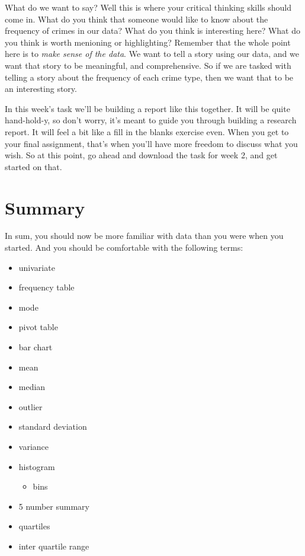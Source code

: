 \documentclass[
]{book}
\providecommand{\tightlist}{%
  \setlength{\itemsep}{0pt}\setlength{\parskip}{0pt}}
\begin{document}
What do we want to say? Well this is where your critical thinking skills should come in. What do you think that someone would like to know about the frequency of crimes in our data? What do you think is interesting here? What do you think is worth menioning or highlighting? Remember that the whole point here is to \emph{make sense of the data}. We want to tell a story using our data, and we want that story to be meaningful, and comprehensive. So if we are tasked with telling a story about the frequency of each crime type, then we want that to be an interesting story.

In this week's task we'll be building a report like this together. It will be quite hand-hold-y, so don't worry, it's meant to guide you through building a research report. It will feel a bit like a fill in the blanks exercise even. When you get to your final assignment, that's when you'll have more freedom to discuss what you wish. So at this point, go ahead and download the task for week 2, and get started on that.

\hypertarget{summary-1}{%
\section{Summary}\label{summary-1}}

In sum, you should now be more familiar with data than you were when you started. And you should be comfortable with the following terms:

\begin{itemize}
\tightlist
\item
  univariate
\item
  frequency table
\item
  mode
\item
  pivot table
\item
  bar chart
\item
  mean
\item
  median
\item
  outlier
\item
  standard deviation
\item
  variance
\item
  histogram

  \begin{itemize}
  \tightlist
  \item
    bins
  \end{itemize}
\item
  5 number summary
\item
  quartiles
\item
  inter quartile range
\end{itemize}
\end{document}
